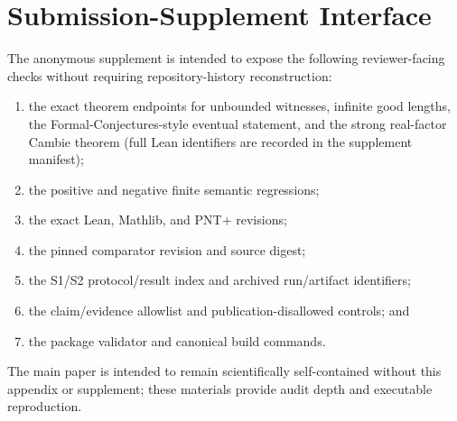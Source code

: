 \documentclass[sigplan,10pt,anonymous,review]{acmart}
\begin{document}
\appendix
\section{Submission-Supplement Interface}
The anonymous supplement is intended to expose the following reviewer-facing checks without requiring repository-history reconstruction:
\begin{enumerate}
\item the exact theorem endpoints for unbounded witnesses, infinite good lengths, the Formal-Conjectures-style eventual statement, and the strong real-factor Cambie theorem (full Lean identifiers are recorded in the supplement manifest);
\item the positive and negative finite semantic regressions;
\item the exact Lean, Mathlib, and PNT+ revisions;
\item the pinned comparator revision and source digest;
\item the S1/S2 protocol/result index and archived run/artifact identifiers;
\item the claim/evidence allowlist and publication-disallowed controls; and
\item the package validator and canonical build commands.
\end{enumerate}
The main paper is intended to remain scientifically self-contained without this appendix or supplement; these materials provide audit depth and executable reproduction.
\end{document}
